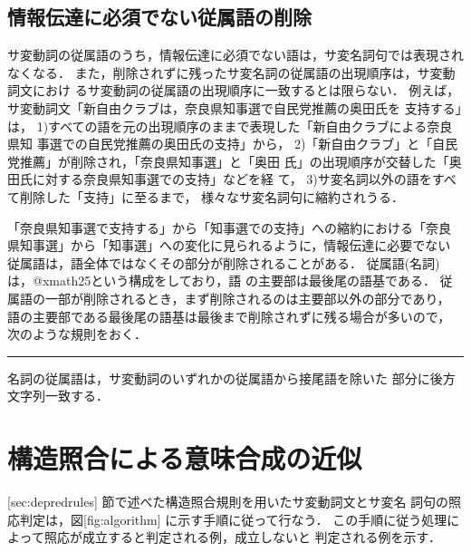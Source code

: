 \subsection{情報伝達に必須でない従属語の削除}

サ変動詞の従属語のうち，情報伝達に必須でない語は，サ変名詞句では表現され
なくなる．
また，削除されずに残ったサ変名詞の従属語の出現順序は，サ変動詞文におけ
るサ変動詞の従属語の出現順序に一致するとは限らない．
例えば，サ変動詞文「新自由クラブは，奈良県知事選で自民党推薦の奥田氏を
支持する」は，
1)すべての語を元の出現順序のままで表現した「新自由クラブによる奈良県知
事選での自民党推薦の奥田氏の支持」から，
2)「新自由クラブ」と「自民党推薦」が削除され，「奈良県知事選」と「奥田
氏」の出現順序が交替した「奥田氏に対する奈良県知事選での支持」などを経
て，
3)サ変名詞以外の語をすべて削除した「支持」に至るまで，
様々なサ変名詞句に縮約されうる．

「奈良県知事選で支持する」から「知事選での支持」への縮約における「奈良
県知事選」から「知事選」への変化に見られるように，情報伝達に必要でない
従属語は，語全体ではなくその部分が削除されることがある．
従属語(名詞)は，@xmath25という構成をしており，語
の主要部は最後尾の語基である．
従属語の一部が削除されるとき，まず削除されるのは主要部以外の部分であり，
語の主要部である最後尾の語基は最後まで削除されずに残る場合が多いので，
次のような規則をおく．
\begin{RULE}
\rule サ変名詞の従属語は，サ変動詞のいずれかの従属語から接尾語を除いた
部分に後方文字列一致する．
 
\end{RULE}


\section{構造照合による意味合成の近似}


[sec:depredrules] 節で述べた構造照合規則を用いたサ変動詞文とサ変名
詞句の照応判定は，図[fig:algorithm] に示す手順に従って行なう．
この手順に従う処理によって照応が成立すると判定される例，成立しないと
判定される例を示す．


